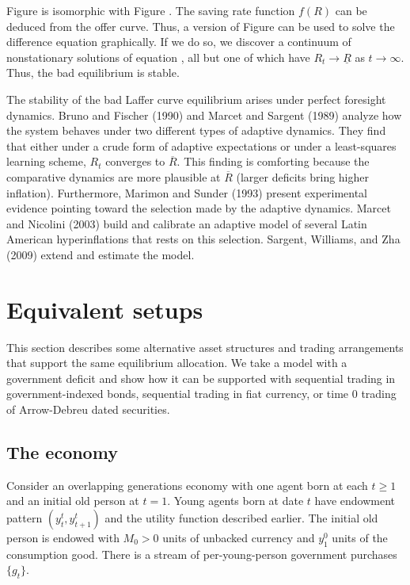 Figure  %
is isomorphic with Figure . %
  The saving rate function
$f(R)$ can be deduced from the offer curve. Thus, a version of
Figure  %
 can be used to solve the difference equation 
graphically. If we do so, we discover a continuum of nonstationary solutions
of  equation  , all but one of which  have
$R_t \rightarrow \underline R$ as $t \rightarrow \infty$.  Thus, the
bad  equilibrium is stable.

The stability of the bad Laffer curve equilibrium arises under
perfect foresight dynamics.
Bruno and Fischer (1990) and Marcet and Sargent (1989) analyze
how the system behaves under two different types of adaptive
dynamics.  They find that either under a crude form
of  adaptive expectations  or under a least-squares learning scheme,
$R_t$ converges to  $\overline R$.   This finding  is comforting because
the comparative dynamics are more plausible at $\overline  R$
(larger deficits bring higher inflation).  Furthermore,
Marimon and Sunder (1993) present experimental evidence
pointing toward the selection  made by the adaptive dynamics.
Marcet and Nicolini  (2003) build and calibrate an adaptive model of several
Latin American hyperinflations that rests on this selection. Sargent, Williams, and Zha (2009)
extend and estimate the model.
%
%

\section{Equivalent setups}

  This section describes some alternative asset structures
and trading arrangements that support the
same equilibrium  allocation.   We take a model with
a government deficit and show how it can be supported
with sequential trading in government-indexed bonds,
sequential trading in fiat currency, or time $0$ trading
of Arrow-Debreu dated securities.


\subsection{The economy}

Consider an overlapping generations economy with one agent
born at each $t\geq 1$ and an initial old  person at $t=1$.
Young agents born at date $t$ have endowment
pattern $(y_t^t, y^t_{t+1})$ and the  utility function described
earlier.   The initial old person is endowed with $M_0>0$ units
of unbacked currency and $y^0_1$ units of the consumption good.
There is a stream of per-young-person government purchases
$\{g_t\}$.

